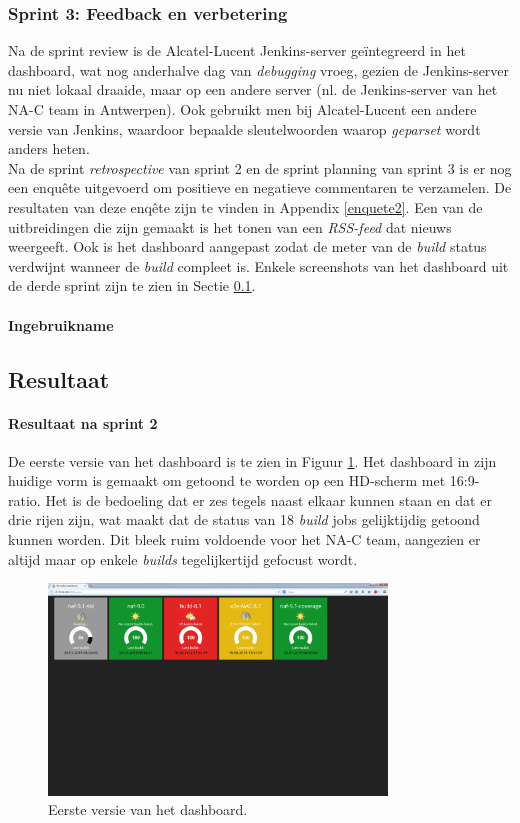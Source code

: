 \documentclass[10pt,a4paper]{article}
\begin{document}
\subsubsection{Sprint 3: Feedback en verbetering}
\label{sprint3}
Na de sprint review is de Alcatel-Lucent Jenkins-server ge\"integreerd in het dashboard, wat nog anderhalve dag van \textit{debugging} vroeg, gezien de Jenkins-server nu niet lokaal draaide, maar op een andere server (nl. de Jenkins-server van het NA-C team in Antwerpen). Ook gebruikt men bij Alcatel-Lucent een andere versie van Jenkins, waardoor bepaalde sleutelwoorden waarop \textit{geparset} wordt anders heten.\\
Na de sprint \textit{retrospective} van sprint 2 en de sprint planning van sprint 3 is er nog een enqu\^ete uitgevoerd om positieve en negatieve commentaren te verzamelen. De resultaten van deze enq\^ete zijn te vinden in Appendix \ref{enquete2}.
Een van de uitbreidingen die zijn gemaakt is het tonen van een \textit{RSS-feed} dat nieuws weergeeft. Ook is het dashboard aangepast zodat de meter van de \textit{build} status verdwijnt wanneer de \textit{build} compleet is. Enkele screenshots van het dashboard uit de derde sprint zijn te zien in Sectie \ref{resultaat}.
\paragraph{Ingebruikname} 
\subsection{Resultaat}
\label{resultaat}
\paragraph{Resultaat na sprint 2}
De eerste versie van het dashboard is te zien in Figuur \ref{dash_1}. Het dashboard in zijn huidige vorm is gemaakt om getoond te worden op een HD-scherm met 16:9-ratio. Het is de bedoeling dat er zes tegels naast elkaar kunnen staan en dat er drie rijen zijn, wat maakt dat de status van 18 \textit{build} jobs gelijktijdig getoond kunnen worden. Dit bleek ruim voldoende voor het NA-C team, aangezien er altijd maar op enkele \textit{builds} tegelijkertijd gefocust wordt.

\begin{figure}[ht!]
\centering
\includegraphics[width=90mm]{dashboard_screenshot1.png}
\caption{Eerste versie van het dashboard.} 
\label{dash_1}
\end{figure}
\end{document}

